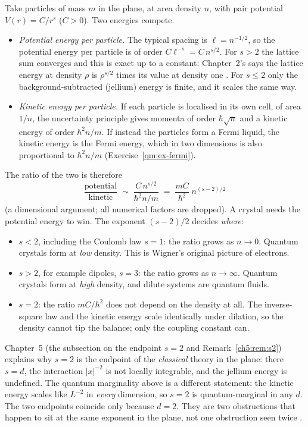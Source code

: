 Take particles of mass $m$ in the plane, at area density $n$, with pair potential $V(r)=C/r^s$ ($C>0$). Two
energies compete.
\begin{itemize}
\item \emph{Potential energy per particle.} The typical spacing is $\ell=n^{-1/2}$, so the potential energy per
particle is of order $C\ell^{-s}=C\,n^{s/2}$. For $s>2$ the lattice sum converges and this is exact up to a
constant: Chapter~2's  says the lattice energy at density $\rho$ is $\rho^{s/2}$ times
its value at density one \tierA. For $s\le2$ only the background-subtracted (jellium) energy is finite, and it scales
the same way.
\item \emph{Kinetic energy per particle.} If each particle is localised in its own cell, of area $1/n$, the
uncertainty principle gives momenta of order $\hbar\sqrt n$ and a kinetic energy of order $\hbar^2 n/m$. If instead
the particles form a Fermi liquid, the kinetic energy is the Fermi energy, which in two dimensions is also
proportional to $\hbar^2n/m$ (Exercise~\ref{qm:ex-fermi}).
\end{itemize}
The ratio of the two is therefore
\begin{equation}\label{qm:eq-ratio}
\frac{\text{potential}}{\text{kinetic}}\;\sim\;\frac{C\,n^{s/2}}{\hbar^2n/m}\;=\;\frac{mC}{\hbar^2}\;n^{(s-2)/2}
\end{equation}
\tierC{} (a dimensional argument; all numerical factors are dropped). A crystal needs the potential energy to win.
The exponent $(s-2)/2$ decides \emph{where}:
\begin{itemize}
\item $s<2$, including the Coulomb law $s=1$: the ratio grows as $n\to0$. Quantum crystals form at \emph{low}
density. This is Wigner's original picture of electrons.
\item $s>2$, for example dipoles, $s=3$: the ratio grows as $n\to\infty$. Quantum crystals form at \emph{high}
density, and dilute systems are quantum fluids.
\item $s=2$: the ratio $mC/\hbar^2$ does not depend on the density at all. The inverse-square law and the kinetic
energy scale identically under dilation, so the density cannot tip the balance; only the coupling constant can.
\end{itemize}

\begin{remark}[two different $s=2$ endpoints]\label{qm:rem-s2}
Chapter~5 (the subsection on the endpoint $s=2$ and Remark~\ref{ch5:rem:s2}) explains why $s=2$ is the endpoint of the
\emph{classical} theory in the plane: there $s=d$, the interaction $|x|^{-2}$ is not locally integrable, and the
jellium energy is undefined. The quantum marginality above is a different statement: the kinetic energy scales like
$L^{-2}$ in \emph{every} dimension, so $s=2$ is quantum-marginal in any $d$. The two endpoints coincide only because
$d=2$. They are two obstructions that happen to sit at the same exponent in the plane, not one obstruction seen
twice \tierC.
\end{remark}

